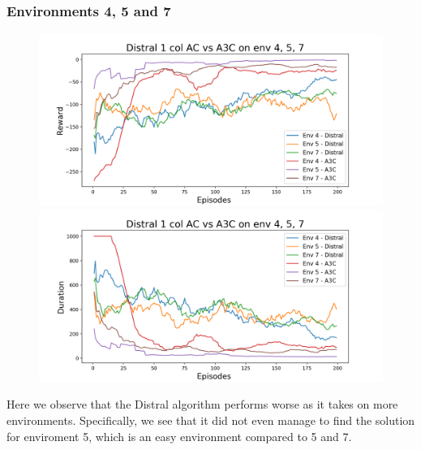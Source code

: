 \documentclass[12pt]{report}
\begin{document}
\subsubsection{Environments 4, 5 and 7}
\begin{figure}[H]
\centering
\begin{minipage}{.5\textwidth}
\centering
\includegraphics[width=\textwidth]{figs/d1_col_ac/d1_col_ac_4_5_7_rwd.png}
\end{minipage}%
\centering
\begin{minipage}{.5\textwidth}
\centering
\includegraphics[width=\textwidth]{figs/d1_col_ac/d1_col_ac_4_5_7_dur.png}
\end{minipage}%
\end{figure}
Here we observe that the Distral algorithm performs worse as it takes on more environments. Specifically, we see that it did not even manage to find the solution for enviroment 5, which is an easy environment compared to 5 and 7.
\end{document}
